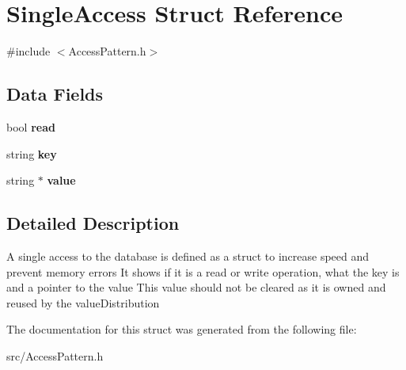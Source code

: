 \hypertarget{structSingleAccess}{
\section{SingleAccess Struct Reference}
\label{structSingleAccess}
}


{\ttfamily \#include $<$AccessPattern.h$>$}\subsection*{Data Fields}
\begin{DoxyCompactItemize}
\item 
\hypertarget{structSingleAccess_a2e929c9bcb7bc195230f3ceea90028da}{
bool {\bfseries read}}
\label{structSingleAccess_a2e929c9bcb7bc195230f3ceea90028da}

\item 
\hypertarget{structSingleAccess_a96ac3bf0a548e0fe74d11ca3c7fd337d}{
string {\bfseries key}}
\label{structSingleAccess_a96ac3bf0a548e0fe74d11ca3c7fd337d}

\item 
\hypertarget{structSingleAccess_a427f0fee8c2bef6c7830811d95b86202}{
string $\ast$ {\bfseries value}}
\label{structSingleAccess_a427f0fee8c2bef6c7830811d95b86202}

\end{DoxyCompactItemize}


\subsection{Detailed Description}
A single access to the database is defined as a struct to increase speed and prevent memory errors It shows if it is a read or write operation, what the key is and a pointer to the value This value should not be cleared as it is owned and reused by the valueDistribution 

The documentation for this struct was generated from the following file:\begin{DoxyCompactItemize}
\item 
src/AccessPattern.h\end{DoxyCompactItemize}
